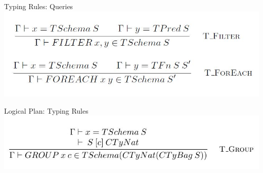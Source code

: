 \begin{frame}{Typing Rules: Queries}
\centering
\includegraphics[scale=0.4]{Images/TypingRules/FilterForeach.JPG}
\end{frame}

\begin{frame}{Logical Plan: Typing Rules}
\centering
\includegraphics[scale=0.4]{Images/TypingRules/Group.JPG}
\end{frame}


